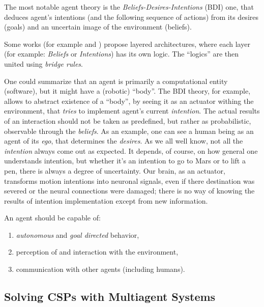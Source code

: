 \documentclass[ThesisDoc]{subfiles}
\begin{document}
The most notable agent theory is the \emph{Beliefs-Desires-Intentions} (BDI) one,
that deduces agent's intentions (and the following sequence of actions)
from its desires (goals) and an uncertain image of the environment (beliefs).


Some works (for example \cite{UAB-Thesis} and \cite{PNoriega}) propose
layered architectures, where each layer (for example: \emph{Beliefs} or \emph{Intentions})
has its own logic. The ``logics'' are then united using \emph{bridge rules}.



\medskip

\noindent
One could summarize that an agent is primarily a computational entity (software),
but it might have a (robotic) ``body''.
The BDI theory, for example, allows to abstract existence of a ``body'',
by seeing it as an actuator withing the environment, that \emph{tries} to
implement agent's current \emph{intention}.
The actual results of an interaction should not be taken as predefined, but rather
as probabilistic, observable through the \emph{beliefs}. As an example, one can
see a human being as an agent of its \emph{ego}, that determines the \emph{desires}.
As we all well know, not all the \emph{intention} always come out as expected.
It depends, of course, on how general one understands intention, but whether
it's an intention to go to Mars or to lift a pen, there is always a degree of
uncertainty. Our brain, as an actuator, transforms motion intentions into
neuronal signals, even if there destination was severed or the neural connections
were damaged; there is no way of knowing the results of intention implementation
except from new information.

\bigskip

\noindent
An agent should be capable of:
\begin{enumerate}
  \item \emph{autonomous} and \emph{goal directed} behavior,
  \item perception of and interaction with the environment,
  \item communication with other agents (including humans).
\end{enumerate}


\subsection{Solving CSPs with Multiagent Systems}
\end{document}
